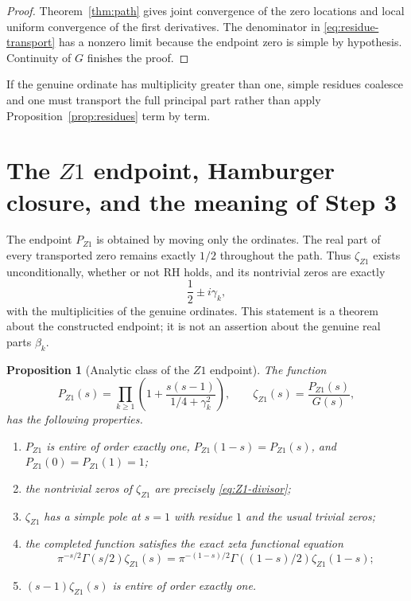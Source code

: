 \documentclass[11pt,reqno]{amsart}
\newtheorem{proposition}[theorem]{Proposition}
\theoremstyle{definition}
\theoremstyle{remark}
\begin{document}
\begin{proof}
Theorem~\ref{thm:path} gives joint convergence of the zero locations and local uniform convergence of the first derivatives.  The denominator in \eqref{eq:residue-transport} has a nonzero limit because the endpoint zero is simple by hypothesis.  Continuity of $G$ finishes the proof.
\end{proof}

If the genuine ordinate has multiplicity greater than one, simple residues coalesce and one must transport the full principal part rather than apply Proposition~\ref{prop:residues} term by term.

\section{The $Z1$ endpoint, Hamburger closure, and the meaning of Step 3}
\label{sec:Z1-endpoint}

The endpoint $P_{Z1}$ is obtained by moving only the ordinates.  The real part of every transported zero remains exactly $1/2$ throughout the path.  Thus $\zeta_{Z1}$ exists unconditionally, whether or not RH holds, and its nontrivial zeros are exactly
\begin{equation}\label{eq:Z1-divisor}
 \frac12\pm i\gamma_k,
\end{equation}
with the multiplicities of the genuine ordinates.  This statement is a theorem about the constructed endpoint; it is not an assertion about the genuine real parts $\beta_k$.

\begin{proposition}[Analytic class of the $Z1$ endpoint]\label{prop:Z1-class}
The function
\begin{equation}\label{eq:Z1-product}
 P_{Z1}(s)=\prod_{k\ge1}\left(1+\frac{s(s-1)}{1/4+\gamma_k^2}\right),
 \qquad
 \zeta_{Z1}(s)=\frac{P_{Z1}(s)}{G(s)},
\end{equation}
has the following properties.
\begin{enumerate}[label=\textup{(\roman*)}]
\item $P_{Z1}$ is entire of order exactly one, $P_{Z1}(1-s)=P_{Z1}(s)$, and $P_{Z1}(0)=P_{Z1}(1)=1$;
\item the nontrivial zeros of $\zeta_{Z1}$ are precisely \eqref{eq:Z1-divisor};
\item $\zeta_{Z1}$ has a simple pole at $s=1$ with residue $1$ and the usual trivial zeros;
\item the completed function satisfies the exact zeta functional equation
\begin{equation}\label{eq:Z1-FE}
 \boxed{
 \pi^{-s/2}\Gamma(s/2)\zeta_{Z1}(s)
 =\pi^{-(1-s)/2}\Gamma((1-s)/2)\zeta_{Z1}(1-s);}
\end{equation}
\item $(s-1)\zeta_{Z1}(s)$ is entire of order exactly one.
\end{enumerate}
\end{proposition}
\end{document}
